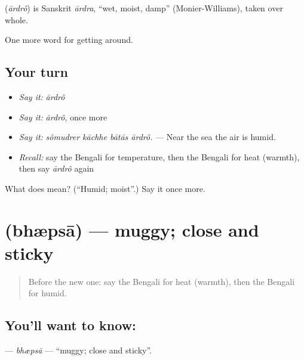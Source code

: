 \begin{cousinweb}
\textbf{} (\emph{ārdrô}) is Sanskrit \emph{ārdra}, \textquotedblleft{}wet, moist, damp\textquotedblright{} (Monier-Williams), taken over whole.
\end{cousinweb}

\begin{grammarlens}[title={What you've built}]
One more word for getting around.
\end{grammarlens}

\subsection*{Your turn}
\begin{itemize}
\raggedright
  \item \emph{Say it:} \emph{ārdrô}
  \item \emph{Say it:} \emph{ārdrô}, once more
  \item \emph{Say it:} \emph{sômudrer kāchhe bātās ārdrô.} — Near the sea the air is humid.
  \item \emph{Recall:} say the Bengali for temperature, then the Bengali for heat (warmth), then say \emph{ārdrô} again
\end{itemize}

\begin{tcolorbox}[breakable,colback=teal!4,colframe=teal!35!black,title={Before you move on}]
What does  mean? (\textquotedblleft{}Humid; moist\textquotedblright{}.) Say it once more.
\end{tcolorbox}
\section[\texorpdfstring{\bn{ভ্যাপসা} (bhæpsā)}{ভ্যাপসা (bhæpsā)}]{ (bhæpsā) — muggy; close and sticky}

\label{lesson:BN-C428-bhepsa}



\begin{quote}
Before the new one: say the Bengali for heat (warmth), then the Bengali for humid.
\end{quote}

\subsection*{You'll want to know: }
\textbf{} — \emph{bhæpsā} — \textquotedblleft{}muggy; close and sticky\textquotedblright{}.

